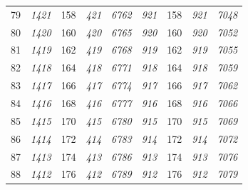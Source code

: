 \documentclass[10pt,fleqn]{article}
\begin{document}
\begin{longtable}{c|cccccccc}
79 & {\color{blue} \it 1421 \rm} & {\color{black} 158} & {\color{blue} \it 421 \rm} & {\color{blue} \it 6762 \rm} & {\color{blue} \it 921 \rm} & {\color{black} 158} & {\color{blue} \it 921 \rm} & {\color{blue} \it 7048 \rm} \\
80 & {\color{blue} \it 1420 \rm} & {\color{black} 160} & {\color{blue} \it 420 \rm} & {\color{blue} \it 6765 \rm} & {\color{blue} \it 920 \rm} & {\color{black} 160} & {\color{blue} \it 920 \rm} & {\color{blue} \it 7052 \rm} \\
81 & {\color{blue} \it 1419 \rm} & {\color{black} 162} & {\color{blue} \it 419 \rm} & {\color{blue} \it 6768 \rm} & {\color{blue} \it 919 \rm} & {\color{black} 162} & {\color{blue} \it 919 \rm} & {\color{blue} \it 7055 \rm} \\
82 & {\color{blue} \it 1418 \rm} & {\color{black} 164} & {\color{blue} \it 418 \rm} & {\color{blue} \it 6771 \rm} & {\color{blue} \it 918 \rm} & {\color{black} 164} & {\color{blue} \it 918 \rm} & {\color{blue} \it 7059 \rm} \\
83 & {\color{blue} \it 1417 \rm} & {\color{black} 166} & {\color{blue} \it 417 \rm} & {\color{blue} \it 6774 \rm} & {\color{blue} \it 917 \rm} & {\color{black} 166} & {\color{blue} \it 917 \rm} & {\color{blue} \it 7062 \rm} \\
84 & {\color{blue} \it 1416 \rm} & {\color{black} 168} & {\color{blue} \it 416 \rm} & {\color{blue} \it 6777 \rm} & {\color{blue} \it 916 \rm} & {\color{black} 168} & {\color{blue} \it 916 \rm} & {\color{blue} \it 7066 \rm} \\
85 & {\color{blue} \it 1415 \rm} & {\color{black} 170} & {\color{blue} \it 415 \rm} & {\color{blue} \it 6780 \rm} & {\color{blue} \it 915 \rm} & {\color{black} 170} & {\color{blue} \it 915 \rm} & {\color{blue} \it 7069 \rm} \\
86 & {\color{blue} \it 1414 \rm} & {\color{black} 172} & {\color{blue} \it 414 \rm} & {\color{blue} \it 6783 \rm} & {\color{blue} \it 914 \rm} & {\color{black} 172} & {\color{blue} \it 914 \rm} & {\color{blue} \it 7072 \rm} \\
87 & {\color{blue} \it 1413 \rm} & {\color{black} 174} & {\color{blue} \it 413 \rm} & {\color{blue} \it 6786 \rm} & {\color{blue} \it 913 \rm} & {\color{black} 174} & {\color{blue} \it 913 \rm} & {\color{blue} \it 7076 \rm} \\
88 & {\color{blue} \it 1412 \rm} & {\color{black} 176} & {\color{blue} \it 412 \rm} & {\color{blue} \it 6789 \rm} & {\color{blue} \it 912 \rm} & {\color{black} 176} & {\color{blue} \it 912 \rm} & {\color{blue} \it 7079 \rm} \\

\end{longtable}
\end{document}
